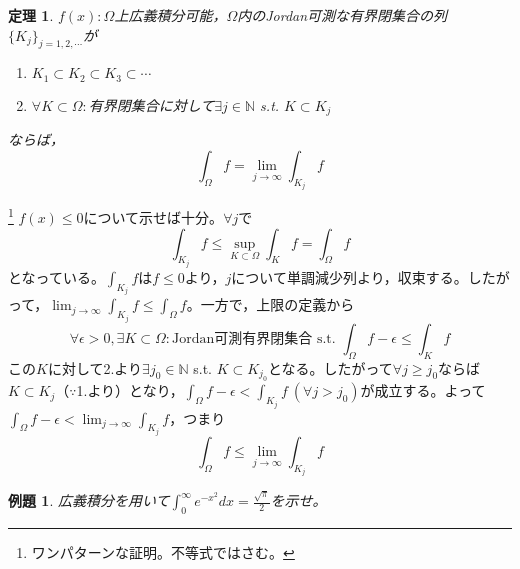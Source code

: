 \documentclass[dvipdfmx,a4j,10pt]{jsarticle}
\makeatletter
\theoremstyle{mystyle1}
\newtheorem{thm}[dfn]{定理}
\theoremstyle{mystyle2}
\newtheorem{ex}{例題}
\renewenvironment{proof}[1][\proofname]{\par
  \pushQED{\qed}%
  \normalfont
  \topsep6\p@\@plus6\p@ \trivlist
  \item[\hskip\labelsep{\bfseries\sffamily #1}]\ignorespaces
}{%
  \popQED\endtrivlist\@endpefalse
}
\renewcommand\proofname{証明}
\makeatother
\begin{document}


\begin{framed}
	\begin{thm}
		$f(x):\Omega$上広義積分可能，$\Omega$内のJordan可測な有界閉集合の列$\{K_j\}_{j=1,2,\cdots}$が
		\begin{enumerate}
			\item $K_1\subset K_2\subset K_3\subset \cdots$
			\item $\forall K\subset\Omega:$有界閉集合に対して$\exists j\in \mathbb{N}$ s.t. $K\subset K_j$
		\end{enumerate}
		ならば，
		\[
			\int_\Omega f = \lim_{j\to\infty}\int_{K_j} f
		\]
	\end{thm}
\end{framed}

\begin{proof}\footnote{ワンパターンな証明。不等式ではさむ。}
	$f(x)\leq 0$について示せば十分。$\forall j$で
	\[
		\int_{K_j} f\leq \sup_{K\subset\Omega}\int_K f = \int_\Omega f
	\]
	となっている。$\displaystyle\int_{K_j} f$は$f\leq 0$より，$j$について単調減少列より，収束する。したがって，$\displaystyle\lim_{j\to\infty}\int_{K_j}f\leq\int_{\Omega} f$。一方で，上限の定義から
	\[
		\forall\epsilon>0,\exists K\subset\Omega:\textrm{Jordan可測有界閉集合\ s.t.\ }\int_\Omega f-\epsilon \leq \int_K f
	\]
	この$K$に対して2.より$\exists j_0\in\mathbb{N}$ s.t. $K\subset K_{j_0}$となる。したがって$\forall j\geq j_0$ならば$K\subset K_j$（$\because$1.より）となり，$\displaystyle\int_\Omega f-\epsilon < \int_{K_j} f\ (\forall j> j_0)$が成立する。よって$\displaystyle\int_\Omega f-\epsilon < \lim_{j\to\infty}\int_{K_j}f$，つまり
	\[
	\int_\Omega f\leq \lim_{j\to\infty}\int_{K_j}f
	\]
\end{proof}

\begin{ex}
広義積分を用いて$\displaystyle\int_0^\infty e^{-x^2}dx=\frac{\sqrt{\pi}}{2}$を示せ。
\end{ex}
\end{document}
